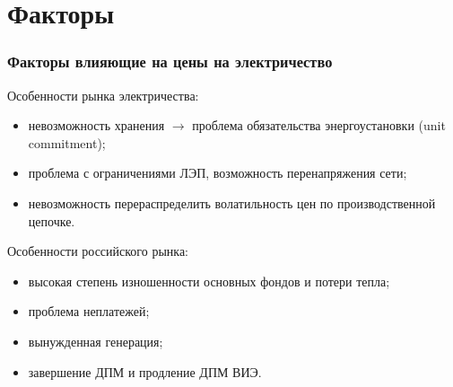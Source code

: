 \documentclass[c, dvipsnames]{beamer}  %
\begin{document}
\section{Факторы}




\begin{frame}[shrink=5]
\frametitle{Факторы  влияющие на цены на электричество} 

Особенности рынка электричества:
\begin{itemize}
	\item невозможность хранения $\rightarrow$ проблема обязательства энергоустановки (unit commitment); 
	\item проблема с ограничениями ЛЭП, возможность перенапряжения сети;
	\item невозможность перераспределить волатильность цен по производственной цепочке. 

\end{itemize}

Особенности российского рынка:

\begin{itemize}
	\item  высокая степень изношенности основных фондов  и потери тепла;
	
	
	
	
	\item  проблема неплатежей; %
	
	
	
	\item  вынужденная генерация;  %
	\item  завершение ДПМ и продление ДПМ ВИЭ.
	

\end{itemize}
\end{frame}
\end{document}
